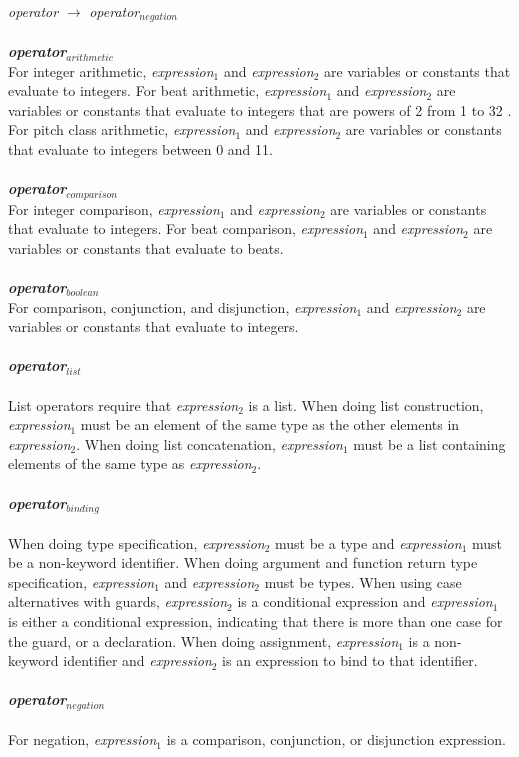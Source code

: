     \emph{operator} $\rightarrow$ \emph{operator$_{negation}$} \\ \\
\textbf{\emph{operator$_{arithmetic}$}} \\
For integer arithmetic, \emph{expression$_{1}$} and \emph{expression$_{2}$} are variables or constants that evaluate to integers. For beat arithmetic, \emph{expression$_{1}$} and \emph{expression$_{2}$} are variables or constants that evaluate to integers that are powers of 2 from 1 to 32 . For pitch class arithmetic, \emph{expression$_{1}$} and \emph{expression$_{2}$} are variables or constants that evaluate to integers between 0 and 11.  \\ \\
\textbf{\emph{operator$_{comparison}$}} \\
For integer comparison, \emph{expression$_{1}$} and \emph{expression$_{2}$} are variables or constants that evaluate to integers. For beat comparison, \emph{expression$_{1}$} and \emph{expression$_{2}$} are variables or constants that evaluate to beats. \\ \\
\textbf{\emph{operator$_{boolean}$}} \\
For comparison, conjunction, and disjunction, \emph{expression$_{1}$} and \emph{expression$_{2}$} are variables or constants that evaluate to integers. \\ \\
\textbf{\emph{operator$_{list}$}} \\ \\
List operators require that  \emph{expression$_{2}$} is a list. When doing list construction,  \emph{expression$_{1}$} must be an element of the same type as the other elements in  \emph{expression$_{2}$}. When doing list concatenation,  \emph{expression$_{1}$} must be a list containing elements of the same type as  \emph{expression$_{2}$}. \\ \\
\textbf{\emph{operator$_{binding}$}} \\ \\
When doing type specification, \emph{expression$_{2}$} must be a type and \emph{expression$_{1}$} must be a non-keyword identifier. When doing argument and function return type specification, \emph{expression$_{1}$} and \emph{expression$_{2}$} must be types. When using case alternatives with guards,  \emph{expression$_{2}$} is a conditional expression and  \emph{expression$_{1}$} is either a conditional expression, indicating that there is more than one case for the guard, or a declaration. When doing assignment,  \emph{expression$_{1}$} is a non-keyword identifier and  \emph{expression$_{2}$} is an expression to bind to that identifier. \\ \\
\textbf{\emph{operator$_{negation}$}} \\ \\
For negation,  \emph{expression$_{1}$} is a comparison, conjunction, or disjunction expression.
    
